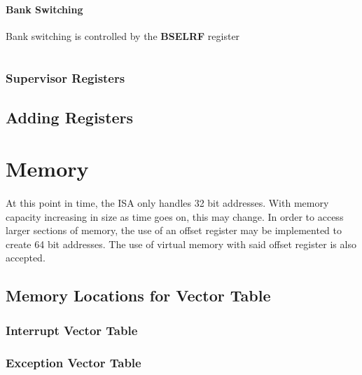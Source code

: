 \documentclass[letterpaper, 11pt]{article}
\begin{document}
\paragraph{Bank Switching} Bank switching is controlled by the \textbf{BSELRF} register\\
\begin{center}
	\begin{tabular}{|c|c|c|c|c|}
		\hline
		\hline
		\hline
		
	\end{tabular}
\end{center}	


\subsubsection{Supervisor Registers}
\subsection{Adding Registers}

\section{Memory}
\paragraph{}At this point in time, the ISA only handles 32 bit addresses.
With memory capacity increasing in size as time goes on, this may change. In order to access 
larger sections of memory, the use of an offset register may be implemented to create 64 bit addresses.
The use of virtual memory with said offset register is also accepted.

\subsection{Memory Locations for Vector Table}
\subsubsection{Interrupt Vector Table}
\subsubsection{Exception Vector Table}
\end{document}
